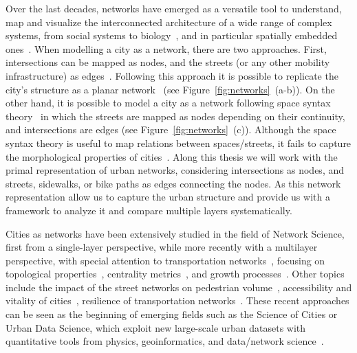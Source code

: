 Over the last decades, networks have emerged as a versatile tool to understand, map and visualize the interconnected architecture of a wide range of complex systems, from social systems to biology~\cite{albert2002statistical, dorogovtsev2002evolution, newman2003structure, boccaletti2006complex}, and in particular spatially embedded ones~\cite{barthelemy2011spatial}. When modelling a city as a network, there are two approaches. First, intersections can be mapped as nodes, and the streets (or any other mobility infrastructure) as edges~\cite{porta2006primal}. Following this approach it is possible to replicate the city's structure as a planar network~\cite{Boeing2020Planarity} (see Figure~\ref{fig:networks}~(a-b)). On the other hand, it is possible to model a city as a network following space syntax theory~\cite{hillier1976syntax} in which the streets are mapped as nodes depending on their continuity, and intersections are edges (see Figure~\ref{fig:networks}~(c)). Although the space syntax theory is useful to map relations between spaces/streets, it fails to capture the morphological properties of cities~\cite{batty2004new}. Along this thesis we will work with the primal representation of urban networks, considering intersections as nodes, and streets, sidewalks, or bike paths as edges connecting the nodes. As this network representation allow us to capture the urban structure and provide us with a framework to analyze it and compare multiple layers systematically.

Cities as networks have been extensively studied in the field of Network Science, first from a single-layer perspective, while more recently with a multilayer perspective, with special attention to transportation networks~\cite{lin2013complex,barthelemy2011spatial,ding2019application}, focusing on topological properties~\cite{jiang2004topological,cardillo2006structural,barthelemy2008patterns,batty2008size,barthelemy2011spatial,strano2013comparative,louf2014typology,boeing2020multiscale}, centrality metrics~\cite{crucitti2008centrality,Boeing2020Planarity,kirkley2018structural}, and growth processes~\cite{makse1995growth,strano2012evolution}. Other topics include the impact of the street networks on pedestrian volume~\cite{hajrasouliha2015connectivity}, accessibility and vitality of cities~\cite{denadai2016death,biazzo2019accesibility}, resilience of transportation networks~\cite{baggag2018resilience,ferretti2019resilience}. These recent approaches can be seen as the beginning of emerging fields such as the Science of Cities or Urban Data Science, which exploit new large-scale urban datasets with quantitative tools from physics, geoinformatics, and data/network science~\cite{batty2013new,resch2019hds}.

